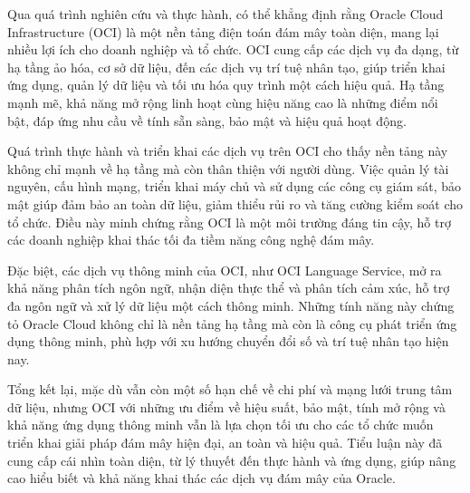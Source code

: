 Qua quá trình nghiên cứu và thực hành, có thể khẳng định rằng Oracle Cloud Infrastructure (OCI) là một nền tảng điện toán đám mây toàn diện, mang lại nhiều lợi ích cho doanh nghiệp và tổ chức. OCI cung cấp các dịch vụ đa dạng, từ hạ tầng ảo hóa, cơ sở dữ liệu, đến các dịch vụ trí tuệ nhân tạo, giúp triển khai ứng dụng, quản lý dữ liệu và tối ưu hóa quy trình một cách hiệu quả. Hạ tầng mạnh mẽ, khả năng mở rộng linh hoạt cùng hiệu năng cao là những điểm nổi bật, đáp ứng nhu cầu về tính sẵn sàng, bảo mật và hiệu quả hoạt động.

Quá trình thực hành và triển khai các dịch vụ trên OCI cho thấy nền tảng này không chỉ mạnh về hạ tầng mà còn thân thiện với người dùng. Việc quản lý tài nguyên, cấu hình mạng, triển khai máy chủ và sử dụng các công cụ giám sát, bảo mật giúp đảm bảo an toàn dữ liệu, giảm thiểu rủi ro và tăng cường kiểm soát cho tổ chức. Điều này minh chứng rằng OCI là một môi trường đáng tin cậy, hỗ trợ các doanh nghiệp khai thác tối đa tiềm năng công nghệ đám mây.

Đặc biệt, các dịch vụ thông minh của OCI, như OCI Language Service, mở ra khả năng phân tích ngôn ngữ, nhận diện thực thể và phân tích cảm xúc, hỗ trợ đa ngôn ngữ và xử lý dữ liệu một cách thông minh. Những tính năng này chứng tỏ Oracle Cloud không chỉ là nền tảng hạ tầng mà còn là công cụ phát triển ứng dụng thông minh, phù hợp với xu hướng chuyển đổi số và trí tuệ nhân tạo hiện nay.

Tổng kết lại, mặc dù vẫn còn một số hạn chế về chi phí và mạng lưới trung tâm dữ liệu, nhưng OCI với những ưu điểm về hiệu suất, bảo mật, tính mở rộng và khả năng ứng dụng thông minh vẫn là lựa chọn tối ưu cho các tổ chức muốn triển khai giải pháp đám mây hiện đại, an toàn và hiệu quả. Tiểu luận này đã cung cấp cái nhìn toàn diện, từ lý thuyết đến thực hành và ứng dụng, giúp nâng cao hiểu biết và khả năng khai thác các dịch vụ đám mây của Oracle.
